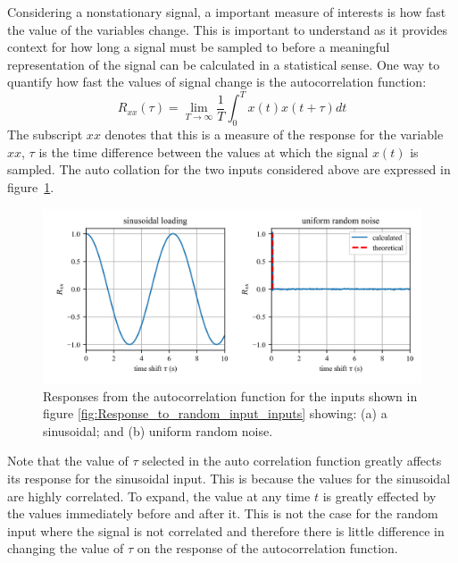\documentclass[12pt,letter]{article}
\numberwithin{ex}{section} %
\numberwithin{re}{section} %
\begin{document}
Considering a nonstationary signal, a important measure of interests is how fast the value of the variables change. This is important to understand as it provides context for how long a signal must be sampled to before a meaningful representation of the signal can be calculated in a statistical sense. One way to quantify how fast the values of signal change is the autocorrelation function: 
\begin{equation}
R_{xx}(\tau) = \lim\limits_{T \rightarrow \infty} \frac{1}{T} \int_{0}^{T}x(t)x(t+\tau)dt
\end{equation}
The subscript $xx$ denotes that this is a measure of the response for the variable $xx$, $\tau$ is the time difference between the values at which the signal $x(t)$ is sampled. The auto collation for the two inputs considered above are expressed in figure~\ref{fig:Response_to_random_input_autocorrelation}.
\begin{figure}[H]
	\centering
	\includegraphics[width=1\textwidth]{../Figures/Response_to_random_input_autocorrelation.png}
	\caption{Responses from the autocorrelation function for the inputs shown in figure \ref{fig:Response_to_random_input_inputs} showing: (a) a sinusoidal; and (b) uniform random noise.}
	\label{fig:Response_to_random_input_autocorrelation}
\end{figure}
\noindent Note that the value of $\tau$ selected in the auto correlation function greatly affects its response for the sinusoidal input. This is because the values for the sinusoidal are highly correlated. To expand, the value at any time $t$ is greatly effected by the values immediately before and after it. This is not the case for the random input where the signal is not correlated and therefore there is little difference in changing the value of $\tau$ on the response of the autocorrelation function.  
\end{document}
